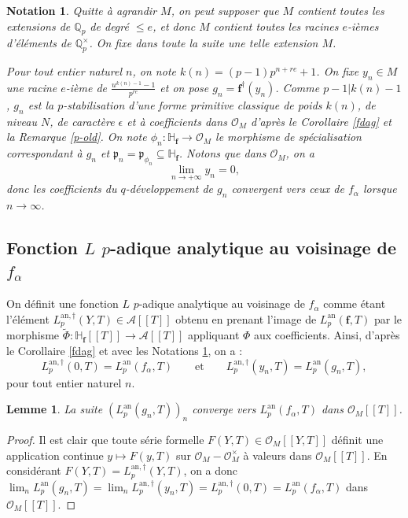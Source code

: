 \documentclass[12pt]{amsart}
\newcommand\bH{\mathbb{H}}
\newcommand\Qp{\mathbb{Q}_{p}}
\newcommand\cA{\mathcal{A}}
\newcommand\cO{\mathcal{O}}
\newcommand\gp{\mathfrak{p}}
\newcommand{\an}{\textrm{an}}
\theoremstyle{defstyle}
\newtheorem{notation}[subsubsection]{Notation}
\theoremstyle{thmstyle}
\newtheorem{lemme}[subsubsection]{Lemme}
\begin{document}
\begin{notation}\label{gn}
	Quitte à agrandir $M$, on peut supposer que $M$ contient toutes les extensions de $\Qp$ de degré $\leq e$, et donc $M$ contient toutes les racines $e$-ièmes d'éléments de $\Qp^\times$. On fixe dans toute la suite une telle extension $M$.
	
	Pour tout entier naturel $n$, on note $k(n)=(p-1)p^{n+re}+1$. On fixe $y_{n} \in M$ une racine $e$-ième de $\frac{u^{k(n)-1}-1}{p^{re}}$ et on pose $g_n=\textbf{f}^\dag(y_n)$. Comme $p-1|k(n)-1$, $g_n$ est la $p$-stabilisation d'une forme primitive classique de poids $k(n)$, de niveau $N$, de caractère $\epsilon$ et à coefficients dans $\cO_M$ d'après le Corollaire \ref{fdag} et la Remarque \ref{p-old}. On note $\phi_n :\bH_\textbf{f} \longrightarrow \cO_M$ le morphisme de spécialisation correspondant à $g_n$ et $\gp_n=\gp_{\phi_n} \subseteq \bH_\textbf{f}$. Notons que dans $\cO_M$, on a
	$$\lim_{n\rightarrow+\infty} y_n=0,$$
	donc les coefficients du $q$-développement de $g_n$ convergent vers ceux de $f_\alpha$ lorsque $n\rightarrow \infty$.
	
\end{notation}

\subsection{Fonction $L$ $p$-adique analytique au voisinage de $f_\alpha$}\label{para_analytique}


On définit une fonction $L$ $p$-adique analytique au voisinage de $f_\alpha$ comme étant l'élément $L^{\an,\dag}_p(Y,T) \in \cA[[T]]$ obtenu en prenant l'image de $L^\an_p(\textbf{f},T)$ par le morphisme $\tilde{\Phi} :\bH_\textbf{f}[[T]] \rightarrow \cA[[T]]$ appliquant $\Phi$ aux coefficients. Ainsi, d'après le Corollaire \ref{fdag} et avec les Notations \ref{gn}, on a : 
$$L_p^{\an,\dag}(0,T)=L^\an_p(f_\alpha,T) \qquad \textrm{et} \qquad  L^{\an,\dag}_p(y_n,T)=L^\an_p(g_n,T),$$
pour tout entier naturel $n$.

\begin{lemme}\label{bn}
	La suite $(L^\an_p(g_n,T))_n$ converge vers $L^\an_p(f_\alpha,T)$ dans $\cO_M[[T]]$. 
\end{lemme}

\begin{proof}
	Il est clair que toute série formelle $F(Y,T) \in \cO_M[[Y,T]]$ définit une application continue $y \longmapsto F(y,T)$ sur $\cO_M-\cO_M^\times$ à valeurs dans $\cO_M[[T]]$. En considérant $F(Y,T)= L_p^{\an,\dag}(Y,T)$, on a donc $\lim_{n} L^\an_p(g_n,T)=\lim_{n} L_p^{\an,\dag}(y_n,T)=L_p^{\an,\dag}(0,T)=L^\an_p(f_\alpha,T)$ dans $\cO_M[[T]]$.
\end{proof}
\end{document}
